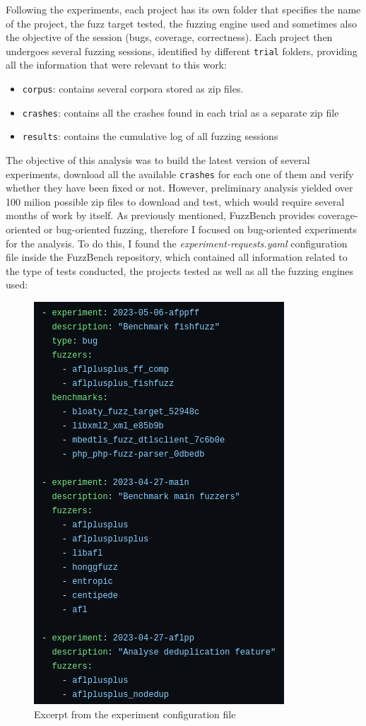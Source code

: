 Following the experiments, each project has its own folder that specifies the name of the project, the fuzz target tested, the fuzzing engine used and sometimes also the objective of the session (bugs, coverage, correctness). Each project then undergoes several fuzzing sessions, identified by different \verb|trial| folders, providing all the information that were relevant to this work:
\begin{itemize}
    \item \verb|corpus|: contains several corpora stored as zip files.
    \item \verb|crashes|: contains all the crashes found in each trial as a separate zip file
    \item \verb|results|: contains the cumulative log of all fuzzing sessions
\end{itemize}


The objective of this analysis was to build the latest version of several experiments, download all the available \verb|crashes| for each one of them and verify whether they have been fixed or not. However, preliminary analysis yielded over 100 milion possible zip files to download and test, which would require several months of work by itself. 
As previously mentioned, FuzzBench provides coverage-oriented or bug-oriented fuzzing, therefore I focused on bug-oriented experiments for the analysis. To do this, I found the \textit{experiment-requests.yaml} configuration file \cite{exp_yaml} inside the FuzzBench repository, which contained all information related to the type of tests conducted, the projects tested as well as all the fuzzing engines used:

\begin{figure}[h]
\centering
\includegraphics[scale=0.58]{foto/exp_yaml.png}
\caption{Excerpt from the experiment configuration file}
\label{fig:exp_yaml}
\end{figure}

